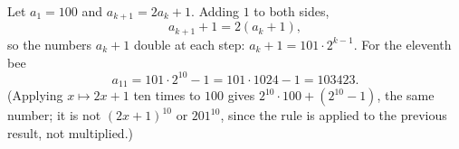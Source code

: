 Let $a_1=100$ and $a_{k+1}=2a_k+1$. Adding $1$ to both sides,
\[
a_{k+1}+1=2(a_k+1),
\]
so the numbers $a_k+1$ double at each step: $a_k+1=101\cdot2^{k-1}$. For the eleventh bee
\[
a_{11}=101\cdot2^{10}-1=101\cdot1024-1=\boxed{103423}.
\]
(Applying $x\mapsto2x+1$ ten times to $100$ gives $2^{10}\cdot100+(2^{10}-1)$, the same number; it is not $(2x+1)^{10}$ or $201^{10}$, since the rule is applied to the previous result, not multiplied.)
